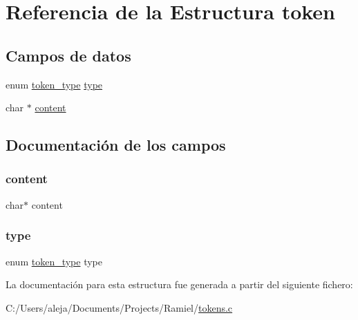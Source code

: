 \hypertarget{structtoken}{}\section{Referencia de la Estructura token}
\label{structtoken}
\subsection*{Campos de datos}
\begin{DoxyCompactItemize}
\item 
enum \mbox{\hyperlink{tokens_8c_afe5ef662303b6b710ea6ee1a944bad0d}{token\+\_\+type}} \mbox{\hyperlink{structtoken_a239b01722e92fe2ca47a025485e55c7f}{type}}
\item 
char $\ast$ \mbox{\hyperlink{structtoken_ab0746fb6288bd31fd0d505fab48d8785}{content}}
\end{DoxyCompactItemize}


\subsection{Documentación de los campos}
\mbox{\label{structtoken_ab0746fb6288bd31fd0d505fab48d8785}} 
\subsubsection{\texorpdfstring{content}{content}}
{\footnotesize\ttfamily char$\ast$ content}

\mbox{\label{structtoken_a239b01722e92fe2ca47a025485e55c7f}} 
\subsubsection{\texorpdfstring{type}{type}}
{\footnotesize\ttfamily enum \mbox{\hyperlink{tokens_8c_afe5ef662303b6b710ea6ee1a944bad0d}{token\+\_\+type}} type}



La documentación para esta estructura fue generada a partir del siguiente fichero\+:\begin{DoxyCompactItemize}
\item 
C\+:/\+Users/aleja/\+Documents/\+Projects/\+Ramiel/\mbox{\hyperlink{tokens_8c}{tokens.\+c}}\end{DoxyCompactItemize}

